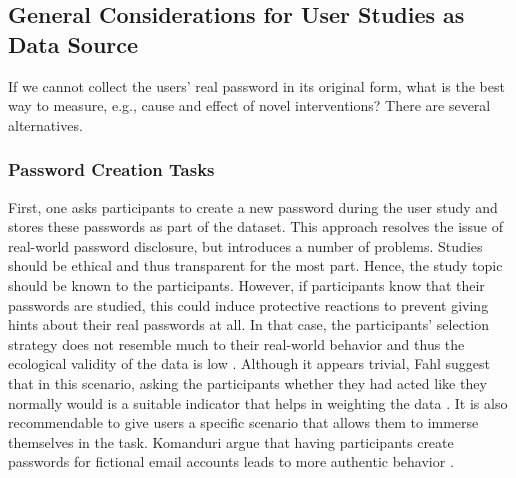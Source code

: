 \subsection{General Considerations for User Studies as Data Source}
If we cannot collect the users' real password in its original form, what is the best way to measure, e.g., cause and effect of novel interventions? There are several alternatives. 
\subsubsection{Password Creation Tasks} First, one asks participants to create a new password during the user study and stores these passwords as part of the dataset. This approach resolves the issue of real-world password disclosure, but introduces a number of problems.
Studies should be ethical and thus transparent for the most part. Hence, the study topic should be known to the participants. However, if participants know that their passwords are studied, this could induce protective reactions to prevent giving hints about their real passwords at all. In that case, the participants' selection strategy does not resemble much to their real-world behavior and thus the ecological validity of the data is low \cite{Shay2012CorrectHorseBatteryStaple}. 
Although it appears trivial, Fahl \etal suggest that in this scenario, asking the participants whether they had acted like they normally would is a suitable indicator that helps in weighting the data \cite{Fahl2013EcologicalValidityPasswordStudy}. It is also recommendable to give users a specific scenario that allows them to immerse themselves in the task. Komanduri \etal argue that having participants create passwords for fictional email accounts leads to more authentic behavior \cite{Komanduri2011OfPasswordsAndPeople}.
